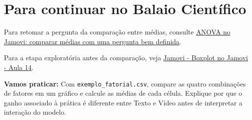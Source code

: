 \section{Para continuar no Balaio Científico}

Para retomar a pergunta da comparação entre médias, consulte \href{https://www.balaiocientifico.com/2026/10/anova-no-jamovi-comparar-medias-com-uma.html}{ANOVA no Jamovi: comparar médias com uma pergunta bem definida}.

Para a etapa exploratória antes da comparação, veja \href{https://www.youtube.com/watch?v=DN4d3LRc13k}{Jamovi - Boxplot no Jamovi - Aula 14}.

\textbf{Vamos praticar:} Com \texttt{exemplo\_fatorial.csv}, compare as quatro combinações de fatores em um gráfico e calcule as médias de cada célula. Explique por que o ganho associado à prática é diferente entre Texto e Vídeo antes de interpretar a interação do modelo.
